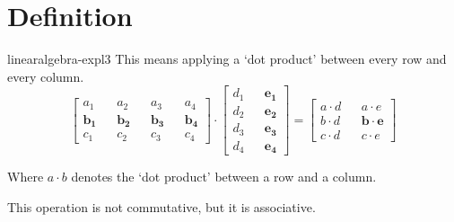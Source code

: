 \documentclass[preview]{standalone}
\begin{document}
\genpage

\section{Definition}








\begin{snippet}{linearalgebra-expl3}
This means applying a `dot product' between every row and every column. \\

\[
    \begin{bmatrix} 
        a_1 && a_2 && a_3 && a_4 \\
        \mathbf{b_1} && \mathbf{b_2} && \mathbf{b_3} && \mathbf{b_4} \\
        c_1 && c_2 && c_3 && c_4
    \end{bmatrix}
    \cdot
    \begin{bmatrix} 
        d_1 && \mathbf{e_1} \\
        d_2 && \mathbf{e_2} \\
        d_3 && \mathbf{e_3} \\
        d_4 && \mathbf{e_4}
    \end{bmatrix}
    =
    \begin{bmatrix} 
        a \cdot d && a \cdot e \\
        b \cdot d && \mathbf{b \cdot e} \\
        c \cdot d && c \cdot e
    \end{bmatrix}
\]

Where \(a \cdot b\) denotes the `dot product' between a row and a column.

This operation is not commutative, but it is associative.
\end{snippet}
\end{document}
